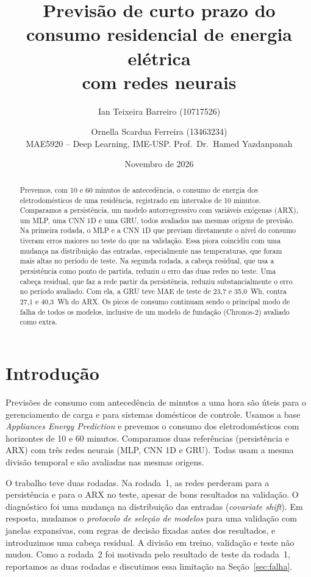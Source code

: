 \documentclass[11pt,a4paper]{article}
\title{Previsão de curto prazo do consumo residencial de energia elétrica\\com redes neurais}
\author{Ian Teixeira Barreiro (10717526) \and Ornella Scardua Ferreira (13463234)\\[4pt]
\small MAE5920 -- Deep Learning, IME-USP. Prof.\ Dr.\ Hamed Yazdanpanah}
\date{Novembro de 2026}
\begin{document}
\maketitle

\begin{abstract}
Prevemos, com 10 e 60 minutos de antecedência, o consumo de energia dos eletrodomésticos de uma residência, registrado em intervalos de 10 minutos. Comparamos a persistência, um modelo autorregressivo com variáveis exógenas (ARX), um MLP, uma CNN 1D e uma GRU, todos avaliados nas mesmas origens de previsão. Na primeira rodada, o MLP e a CNN 1D que previam diretamente o nível do consumo tiveram erros maiores no teste do que na validação. Essa piora coincidiu com uma mudança na distribuição das entradas, especialmente nas temperaturas, que foram mais altas no período de teste. Na segunda rodada, a cabeça residual, que usa a persistência como ponto de partida, reduziu o erro das duas redes no teste. Uma cabeça residual, que faz a rede partir da persistência, reduziu substancialmente o erro no período avaliado. Com ela, a GRU teve MAE de teste de 23,7 e 35,0~Wh, contra 27,1 e 40,3~Wh do ARX. Os picos de consumo continuam sendo o principal modo de falha de todos os modelos, inclusive de um modelo de fundação (Chronos-2) avaliado como extra.
\end{abstract}

\section{Introdução}

Previsões de consumo com antecedência de minutos a uma hora são úteis para o gerenciamento de carga e para sistemas domésticos de controle. Usamos a base \emph{Appliances Energy Prediction} \citep{candanedo2017} e prevemos o consumo dos eletrodomésticos com horizontes de 10 e 60 minutos. Comparamos duas referências (persistência e ARX) com três redes neurais (MLP, CNN 1D e GRU). Todas usam a mesma divisão temporal e são avaliadas nas mesmas origens.

O trabalho teve duas rodadas. Na rodada~1, as redes perderam para a persistência e para o ARX no teste, apesar de bons resultados na validação. O diagnóstico foi uma mudança na distribuição das entradas (\emph{covariate shift}). Em resposta, mudamos o \emph{protocolo de seleção de modelos} para uma validação com janelas expansivas, com regras de decisão fixadas antes dos resultados, e introduzimos uma cabeça residual. A divisão em treino, validação e teste não mudou. Como a rodada~2 foi motivada pelo resultado de teste da rodada~1, reportamos as duas rodadas e discutimos essa limitação na Seção~\ref{sec:falha}.
\end{document}

